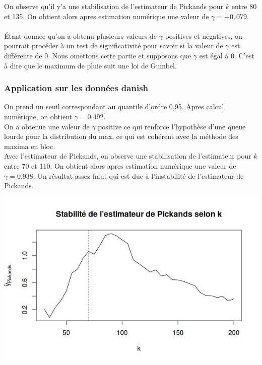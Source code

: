 \documentclass{article}
\theoremstyle{plain}
\theoremstyle{definition}
\theoremstyle{plain}
\begin{document}
On observe qu'il y'a une stabilisation de l'estimateur de Pickands pour $k$ entre 80 et 135. On obtient alors apres estimation numérique une valeur de $\gamma = -0,079$.
\\
\\
Étant donnée qu'on a obtenu plusieurs valeurs de $\gamma$ positives et négatives, on pourrait procéder à un test de significativité pour savoir si la valeur de $\gamma$ est différente de 0. Nous omettons cette partie et supposons que $\gamma$ est égal à 0. C'est à dire que le maximum de pluie suit une loi de Gumbel.
\\
\subsubsection{Application sur les données danish}

On prend un seuil correspondant au quantile d’ordre 0,95. Apres calcul numérique, on obtient $\gamma = 0.492$.
\\
On a obtenue une valeur de $\gamma$ positive ce qui renforce l'hypothèse d'une queue lourde pour la distribution du max, ce qui est cohérent avec la méthode des maxima en bloc. 
\\
Avec l'estimateur de Pickands, on observe une stabilisation de l'estimateur pour $k$ entre 70 et 110. On obtient alors apres estimation numérique une valeur de $\gamma = 0.938$. Un résultat assez haut qui est due à l'instabilité de l'estimateur de Pickands. 

\begin{center}
	\includegraphics[scale=0.65]{./images/pickandsdansih.png} 
\end{center}
\end{document}

